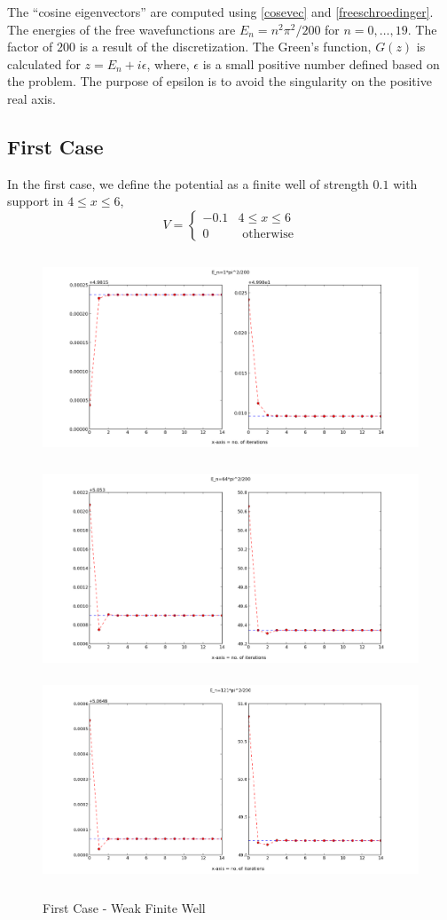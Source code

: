 \documentclass[a4paper,10pt]{report}
\begin{document}
The ``cosine eigenvectors'' are computed using \eqref{cosevec} and \eqref{freeschroedinger}.
The energies of the free wavefunctions are $E_n = n^2\pi^2/200$ for $n=0,\ldots,19$. The factor
of $200$ is a result of the discretization. The Green's function, $G(z)$ is calculated for $z=E_n+i\epsilon$,
where, $\epsilon$ is a small positive number defined based on the problem. The purpose of epsilon is to avoid 
the singularity on the positive real axis.

\subsection{First Case}
In the first case, we define the potential as a finite well of strength $0.1$ with support in $4 \leq x \leq 6$,
\begin{equation}\label{potentialdef1}
V = \begin{cases}
-0.1 &\mbox{} 4\leq x\leq 6\\
0 &\mbox{ otherwise}
\end{cases} 
\end{equation}
\begin{center}
\begin{figure}[htb]
\includegraphics[width=360pt, height=175pt]{series1a.png}
\includegraphics[width=360pt, height=175pt]{series1b.png}
\includegraphics[width=360pt, height=175pt]{series1c.png}
\caption[\textwidth]{First Case - Weak Finite Well}
\end{figure}
\end{center}
\end{document}
